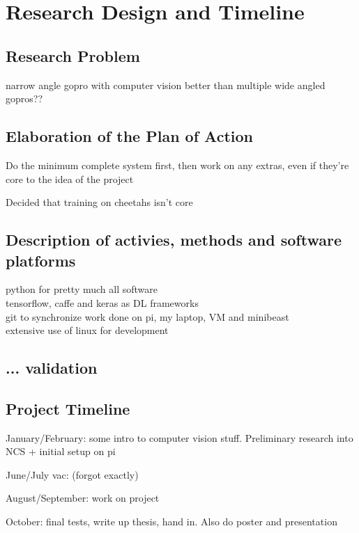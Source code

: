 \section{Research Design and Timeline}
\subsection{Research Problem}
narrow angle gopro with computer vision better than multiple wide angled gopros??
\subsection{Elaboration of the Plan of Action}
Do the minimum complete system first, then work on any extras, even if they're core to the idea of the project

Decided that training on cheetahs isn't core



\subsection{Description of activies, methods and software platforms}
python for pretty much all software \\
tensorflow, caffe and keras as DL frameworks \\
git to synchronize work done on pi, my laptop, VM and minibeast \\
extensive use of linux for development



\subsection{... validation}



\subsection{Project Timeline}
January/February: some intro to computer vision stuff. Preliminary research into NCS + initial setup on pi

June/July vac: (forgot exactly)

August/September: work on project

October: final tests, write up thesis, hand in. Also do poster and presentation

